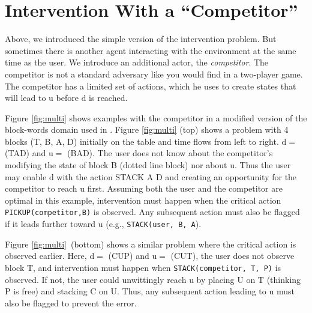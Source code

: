 \documentclass[letterpaper]{article}
\theoremstyle{plain}
\begin{document}
\section{Intervention With a ``Competitor''}
\label{sec:example}
Above, we introduced the simple version of the intervention problem.
But sometimes there is another agent interacting with the environment at the same time as the user.
We introduce an additional actor, the \textit{competitor}. 
The competitor is not a standard adversary like you would find in a two-player game.
The competitor has a limited set of actions, which he uses to create states that will lead to $\mathrm{u}$ before $\mathrm{d}$ is reached.

Figure \ref{fig:multi} shows examples with the competitor in a modified version of the block-words domain used in \cite{ramirez2009plan}.
Figure \ref{fig:multi} (top) shows a problem with 4 blocks (T, B, A, D) initially on the table and time flows from left to right. 
$\mathrm{d}=$ (TAD) and $\mathrm{u}=$ (BAD).
The user does not know about the competitor's modifying the state of block B (dotted line block) nor about $\mathrm{u}$.
Thus the user may enable $\mathrm{d}$ with the action STACK A D and creating an opportunity for the competitor to reach $\mathrm{u}$ first. 
Assuming both the user and the competitor are optimal in this example, intervention must happen when the critical action \texttt{PICKUP(competitor,B)} is observed. 
Any subsequent action must also be flagged if it leads further toward $\mathrm{u}$  (e.g., \texttt{STACK(user, B, A}). 

Figure \ref{fig:multi}~(bottom) shows a similar problem where the critical action is observed earlier.
Here, $\mathrm{d}= $ (CUP) and $\mathrm{u}= $ (CUT), the user does not observe block T, 
and intervention must happen when \texttt{STACK(competitor, T, P)} is observed. If not, the user could unwittingly reach $\mathrm{u}$ by placing U on T (thinking P is free) and stacking C on U. 
Thus, any subsequent action leading  to $\mathrm{u}$ must also be flagged to prevent the error.
\end{document}
